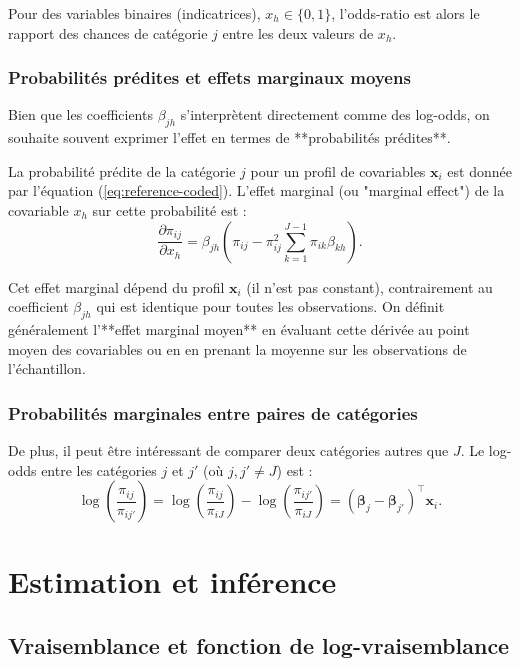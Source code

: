 \documentclass[12pt,a4paper]{article}
\begin{document}
Pour des variables binaires (indicatrices), $x_h \in \{0, 1\}$, l'odds-ratio est alors le rapport des chances de catégorie $j$ entre les deux valeurs de $x_h$.

\subsubsection{Probabilités prédites et effets marginaux moyens}

Bien que les coefficients $\beta_{jh}$ s'interprètent directement comme des log-odds, on souhaite souvent exprimer l'effet en termes de **probabilités prédites**.

La probabilité prédite de la catégorie $j$ pour un profil de covariables $\mathbf{x}_i$ est donnée par l'équation (\ref{eq:reference-coded}). L'effet marginal (ou "marginal effect") de la covariable $x_h$ sur cette probabilité est :
\begin{equation}
\frac{\partial \pi_{ij}}{\partial x_h} = \beta_{jh} \left( \pi_{ij} - \pi_{ij}^2 \sum_{k=1}^{J-1} \pi_{ik} \beta_{kh} \right).
\end{equation}

Cet effet marginal dépend du profil $\mathbf{x}_i$ (il n'est pas constant), contrairement au coefficient $\beta_{jh}$ qui est identique pour toutes les observations. On définit généralement l'**effet marginal moyen** en évaluant cette dérivée au point moyen des covariables ou en en prenant la moyenne sur les observations de l'échantillon.

\subsubsection{Probabilités marginales entre paires de catégories}

De plus, il peut être intéressant de comparer deux catégories autres que $J$. Le log-odds entre les catégories $j$ et $j'$ (où $j, j' \neq J$) est :
\begin{equation}
\log\left(\frac{\pi_{ij}}{\pi_{ij'}}\right) = \log\left(\frac{\pi_{ij}}{\pi_{iJ}}\right) - \log\left(\frac{\pi_{ij'}}{\pi_{iJ}}\right) = (\boldsymbol{\beta}_j - \boldsymbol{\beta}_{j'})^\top \mathbf{x}_i.
\end{equation}

\section{Estimation et inférence}

\subsection{Vraisemblance et fonction de log-vraisemblance}
\end{document}
